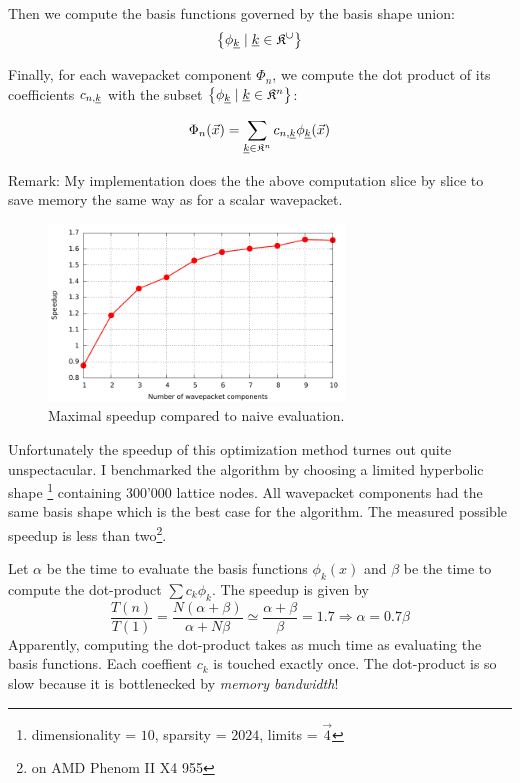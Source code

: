\documentclass{article}
\begin{document}
Then we compute the basis functions governed by the basis shape union:
\[
\left\{\phi_{\underline{k}} \;|\;\underline{k} \in \mathfrak{K}^{\cup}\right\}
\]

Finally, for each wavepacket component \(\Phi_n\),
we compute the dot product of its coefficients \(c_{n,\underline{k}}\)
with the subset \(\left\{\phi_{\underline{k}}\;|\; \underline{k} \in \mathfrak{K}^n\right\}\):

\[
\Phi_n(\vec{x})=\sum_{\underline{k} \in \mathfrak{K}^n} c_{n,\underline{k}} \phi_{\underline{k}}(\vec{x})
\]

Remark: My implementation does the the above computation slice by slice to save memory
the same way as for a scalar wavepacket.

\begin{figure}[H]
  \centering
  \includegraphics[width=0.7\textwidth]{plots/hawp_homogen_evaluation_speedup}
  \caption{Maximal speedup compared to naive evaluation.}
  \label{fig:hawp_homogen_evaluation_speedup}
\end{figure}

Unfortunately the speedup of this optimization method turnes out quite unspectacular.
I benchmarked the algorithm by choosing a limited hyperbolic shape
\footnote{dimensionality = \(10\), sparsity = \(2024\), limits = \(\vec{4}\)}
containing 300'000 lattice nodes.
All wavepacket components had the same basis shape which is the best case for the algorithm.
The measured possible speedup is less than two\footnote{on AMD Phenom II X4 955}.
\par
Let \(\alpha\) be the time to evaluate the basis functions \(\phi_k(x)\) and \(\beta\) be the time to
compute the dot-product \(\sum c_k\phi_k\). The speedup is given by
\[
  \frac{T(n)}{T(1)} = \frac{N(\alpha+\beta)}{\alpha+N\beta} \simeq
  \frac{\alpha+\beta}{\beta} = 1.7 \Rightarrow \alpha = 0.7 \beta
\]
Apparently, computing the dot-product takes as much time as evaluating
the basis functions. Each coeffient \(c_k\) is touched exactly once.
The dot-product is so slow because it is bottlenecked by \emph{memory bandwidth}!
\end{document}
